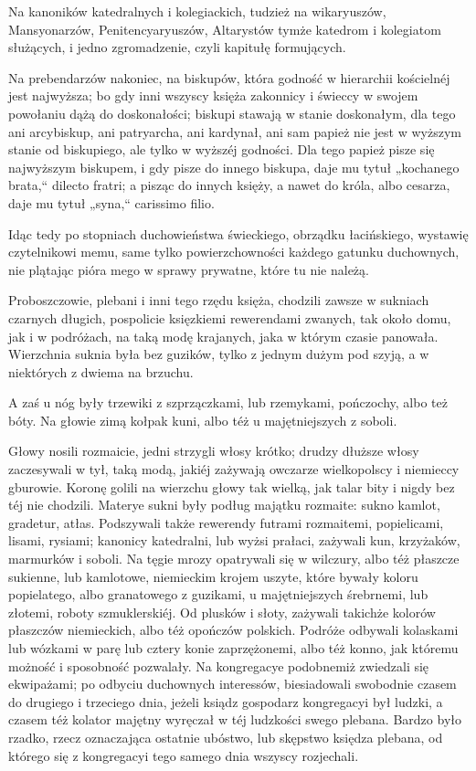 \documentclass{book}
\begin{document}
Na kanoników katedralnych i kolegiackich, tudzież na wikaryuszów, Mansyonarzów, Penitencyaryuszów, Altarystów tymże katedrom i kolegiatom służących, i jedno zgromadzenie, czyli kapitułę formujących.

Na prebendarzów nakoniec, na biskupów, która godność w hierarchii kościelnéj jest najwyższa; bo gdy inni wszyscy księża zakonnicy i świeccy w swojem powołaniu dążą do doskonałości; biskupi stawają w stanie doskonałym, dla tego ani arcybiskup, ani patryarcha, ani kardynał, ani sam papież nie jest w wyższym stanie od biskupiego, ale tylko w wyższéj godności. Dla tego papież pisze się najwyższym biskupem, i gdy pisze do innego biskupa, daje mu tytuł „kochanego brata,“ dilecto fratri; a pisząc do innych księży, a nawet do króla, albo cesarza, daje mu tytuł „syna,“ carissimo filio.

Idąc tedy po stopniach duchowieństwa świeckiego, obrządku łacińskiego, wystawię czytelnikowi memu, same tylko powierzchowności każdego gatunku duchownych, nie plątając pióra mego w sprawy prywatne, które tu nie należą.

Proboszczowie, plebani i inni tego rzędu księża, chodzili zawsze w sukniach czarnych długich, pospolicie księzkiemi rewerendami zwanych, tak około domu, jak i w podróżach, na taką modę krajanych, jaka w którym czasie panowała. Wierzchnia suknia była bez guzików, tylko z jednym dużym pod szyją, a w niektórych z dwiema na brzuchu.

A zaś u nóg były trzewiki z szprzączkami, lub rzemykami, pończochy, albo też bóty. Na głowie zimą kołpak kuni, albo téż u majętniejszych z soboli.

Głowy nosili rozmaicie, jedni strzygli włosy krótko; drudzy dłuższe włosy zaczesywali w tył, taką modą, jakiéj zażywają owczarze wielkopolscy i niemieccy gburowie. Koronę golili na wierzchu głowy tak wielką, jak talar bity i nigdy bez téj nie chodzili. Materye sukni były podług majątku rozmaite: sukno kamlot, gradetur, atłas. Podszywali także rewerendy futrami rozmaitemi, popielicami, lisami, rysiami; kanonicy katedralni, lub wyżsi prałaci, zażywali kun, krzyżaków, marmurków i soboli. Na tęgie mrozy opatrywali się w wilczury, albo téż płaszcze sukienne, lub kamlotowe, niemieckim krojem uszyte, które bywały koloru popielatego, albo granatowego z guzikami, u majętniejszych śrebrnemi, lub złotemi, roboty szmuklerskiéj. Od plusków i słoty, zażywali takichże kolorów płaszczów niemieckich, albo téż opończów polskich. Podróże odbywali kolaskami lub wózkami w parę lub cztery konie zaprzężonemi, albo téż konno, jak któremu możność i sposobność pozwalały. Na kongregacye podobnemiż zwiedzali się ekwipażami; po odbyciu duchownych interessów, biesiadowali swobodnie czasem do drugiego i trzeciego dnia, jeżeli ksiądz gospodarz kongregacyi był ludzki, a czasem téż kolator majętny wyręczał w téj ludzkości swego plebana. Bardzo było rzadko, rzecz oznaczająca ostatnie ubóstwo, lub skępstwo księdza plebana, od którego się z kongregacyi tego samego dnia wszyscy rozjechali.
\end{document}
